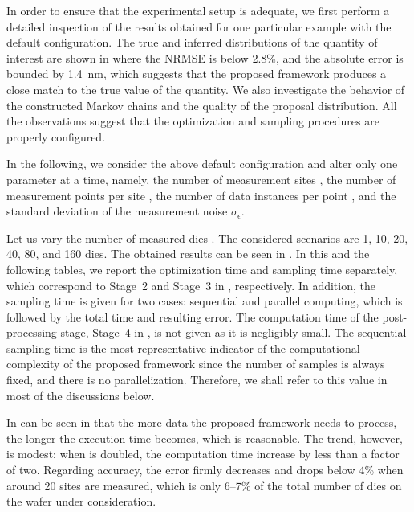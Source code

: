 In order to ensure that the experimental setup is adequate, we first perform a
detailed inspection of the results obtained for one particular example with the
default configuration. The true and inferred distributions of the quantity of
interest are shown in  where the \acf{NRMSE} is below
2.8\%, and the absolute error is bounded by 1.4~nm, which suggests that the
proposed framework produces a close match to the true value of the quantity. We
also investigate the behavior of the constructed Markov chains and the quality
of the proposal distribution. All the observations suggest that the optimization
and sampling procedures are properly configured.

In the following, we consider the above default configuration and alter only one
parameter at a time, namely, the number of measurement sites \hnd, the number of
measurement points per site \np, the number of data instances per point \ns, and
the standard deviation of the measurement noise $\sigma_\epsilon$.


Let us vary the number of measured dies \hnd. The considered scenarios are 1,
10, 20, 40, 80, and 160 dies. The obtained results can be seen in
. In this and the following tables, we report the
optimization time and sampling time separately, which correspond to Stage~2 and
Stage~3 in , respectively. In addition, the sampling
time is given for two cases: sequential and parallel computing, which is
followed by the total time and resulting error. The computation time of the
post-processing stage, Stage~4 in , is not given as it
is negligibly small. The sequential sampling time is the most representative
indicator of the computational complexity of the proposed framework since the
number of samples is always fixed, and there is no parallelization. Therefore,
we shall refer to this value in most of the discussions below.

In can be seen in  that the more data the proposed
framework needs to process, the longer the execution time becomes, which is
reasonable. The trend, however, is modest: when \hnd is doubled, the computation
time increase by less than a factor of two. Regarding accuracy, the error firmly
decreases and drops below 4\% when around 20 sites are measured, which is only
6--7\% of the total number of dies on the wafer under consideration.

